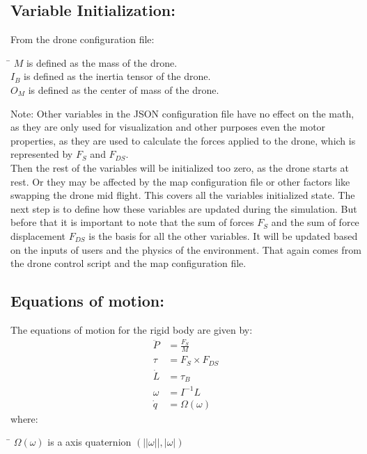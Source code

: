 \documentclass{article}
\begin{document}
\subsection*{Variable Initialization:}
From the drone configuration file:
\begin{tabbing}
    \hspace{1cm}\= \kill
    \> \( M \) is defined as the mass of the drone. \\
    \> \( I_B \) is defined as the inertia tensor of the drone. \\
    \> \( O_M \) is defined as the center of mass of the drone. \\
\end{tabbing}
Note: Other variables in the JSON configuration file have no effect on the math, 
as they are only used for visualization and other purposes even the motor properties, 
as they are used to calculate the forces applied to the drone, which is represented by \( F_S \) and \( F_{DS} \). \\
Then the rest of the variables will be initialized too zero, as the drone starts at rest.
Or they may be affected by the map configuration file or other factors like swapping the drone mid flight.
This covers all the variables initialized state. 
The next step is to define how these variables are updated during the simulation. 
But before that it is important to note that the sum of forces \( F_S \) 
and the sum of force displacement \( F_{DS} \) is the basis for all the other variables.
It will be updated based on the inputs of users and the physics of the environment.
That again comes from the drone control script and the map configuration file.

\subsection*{Equations of motion:}
The equations of motion for the rigid body are given by:
\begin{align*}
    \ddot{P} &= \frac{F_S}{M} \\
    \tau &= F_S \times F_{DS} \\
    \dot{L} &= \tau_B \\
    \omega &= I^{-1} L \\
    \dot{q} &= \Omega(\omega)
\end{align*}
where:
\begin{tabbing}
	\hspace{1cm}\= \kill
	\> \( \Omega(\omega) \) is a axis quaternion \((||\omega||, |\omega|)\)
\end{tabbing}
\end{document}
